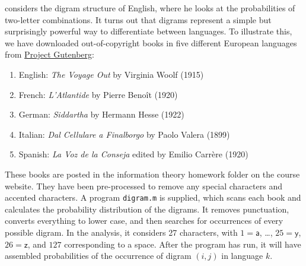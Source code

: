 \documentclass[12pt]{article}
\begin{document}
\begin{enumerate}
    considers the digram structure of English, where he looks at the
    probabilities of two-letter combinations. It turns out that digrams
    represent a simple but surprisingly powerful way to differentiate between
    languages. To illustrate this, we have downloaded out-of-copyright books in
    five different European languages from
    \href{http://www.gutenberg.org/}{Project Gutenberg}:
    \begin{enumerate}
      \item[0.] English: \textit{The Voyage Out} by Virginia Woolf (1915)
      \item[1.] French: \textit{L'Atlantide} by Pierre Beno\^it (1920)
      \item[2.] German: \textit{Siddartha} by Hermann Hesse (1922)
      \item[3.] Italian: \textit{Dal Cellulare a Finalborgo} by Paolo Valera (1899)
      \item[4.] Spanish: \textit{La Voz de la Conseja} edited by Emilio Carr\`ere (1920)
    \end{enumerate}
    These books are posted in the information theory homework folder on the course website. They have been
    pre-processed to remove any special characters and accented characters.
    A program \texttt{digram.m} is supplied, which scans each book and calculates
    the probability distribution of the digrams. It removes punctuation, converts
    everything to lower case, and then searches for occurrences of every possible digram. In the analysis, it
    considers 27 characters, with  $1=\textsf{a}$,
    \ldots, $25=\textsf{y}$,  $26=\textsf{z}$, and $127$ corresponding to a space. 
After the program has run,
    it will have assembled probabilities  of the occurrence
    of digram $(i,j)$ in language $k$.
    \begin{enumerate}

\end{enumerate}
\end{enumerate}
\end{document}

